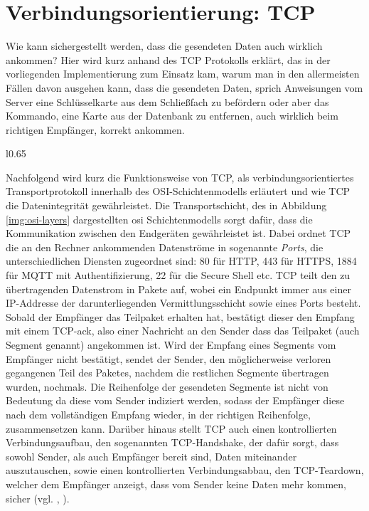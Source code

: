 \section{Verbindungsorientierung: TCP}\label{sec:theory:tcp}
Wie kann sichergestellt werden, dass die gesendeten Daten auch wirklich ankommen? Hier wird kurz anhand des TCP Protokolls erklärt, das in der vorliegenden Implementierung zum Einsatz kam, warum man in den allermeisten Fällen davon ausgehen kann, dass die gesendeten Daten, sprich Anweisungen vom Server eine Schlüsselkarte aus dem Schließfach zu befördern oder aber das Kommando, eine Karte aus der Datenbank zu entfernen, auch wirklich beim richtigen Empfänger, korrekt ankommen.
\begin{wrapfigure}{l}{0.65\textwidth}
\centering

\caption{\centering Datenverkehr zwischen zwei Systemen gemäß dem OSI Schichtenmodell (vgl. \cite{osi-layers})}
\label{img:osi-layers}
\end{wrapfigure}
Nachfolgend wird kurz die Funktionsweise von TCP, als verbindungsorientiertes Transportprotokoll innerhalb des OSI-Schichtenmodells erläutert und wie TCP die Datenintegrität gewährleistet. Die Transportschicht, des in Abbildung \ref{img:osi-layers} dargestellten \acrshort{osi} Schichtenmodells sorgt dafür, dass die Kommunikation zwischen den Endgeräten gewährleistet ist. Dabei ordnet TCP die an den Rechner ankommenden Datenströme in sogenannte \textit{Ports}, die unterschiedlichen Diensten zugeordnet sind: 80 für HTTP, 443 für HTTPS, 1884 für MQTT mit Authentifizierung, 22 für die Secure Shell etc. TCP teilt den zu übertragenden Datenstrom in Pakete auf, wobei ein Endpunkt immer aus einer IP-Addresse der darunterliegenden Vermittlungsschicht sowie eines Ports besteht. Sobald der Empfänger das Teilpaket erhalten hat, bestätigt dieser den Empfang mit einem TCP-\acrshort{ack}, also einer Nachricht an den Sender dass das Teilpaket (auch Segment genannt) angekommen ist. Wird der Empfang eines Segments vom Empfänger nicht bestätigt, sendet der Sender, den möglicherweise verloren gegangenen Teil des Paketes, nachdem die restlichen Segmente übertragen wurden, nochmals. Die Reihenfolge der gesendeten Segmente ist nicht von Bedeutung da diese vom Sender indiziert werden, sodass der Empfänger diese nach dem vollständigen Empfang wieder, in der richtigen Reihenfolge, zusammensetzen kann. Darüber hinaus stellt TCP auch einen kontrollierten Verbindungsaufbau, den sogenannten TCP-Handshake, der dafür sorgt, dass sowohl Sender, als auch Empfänger bereit sind, Daten miteinander auszutauschen, sowie einen kontrollierten Verbindungsabbau, den TCP-Teardown, welcher dem Empfänger anzeigt, dass vom Sender keine Daten mehr kommen, sicher (vgl. \cite{wiki:tcp:handshake}, \cite{wiki:tcp:teardown}).\bigskip

